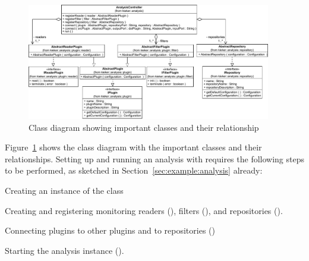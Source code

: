 
\begin{figure}\centering
\includegraphics[width=0.95\textwidth]{images/kieker_AnalysisControlleruserguide-modified}
\caption{Class diagram showing important \KiekerAnalysisPart{} classes and their relationship}
\label{fig:analysisController:classdiagram}
\end{figure}

\pagebreak

\noindent Figure~\ref{fig:analysisController:classdiagram} shows the class diagram %
with the important \KiekerAnalysisPart{} classes and their relationships. %
Setting up and running an analysis with \KiekerAnalysisPart{} requires the %
following steps to be performed, as sketched in Section~\ref{sec:example:analysis} already:

\medskip

\begin{compactenum}
\item Creating an instance of the  class
\item Creating and registering monitoring readers (), 
filters (), and repositories ().
\item Connecting plugins to other plugins and to repositories ()
\item Starting the analysis instance ().
\end{compactenum}

\medskip

